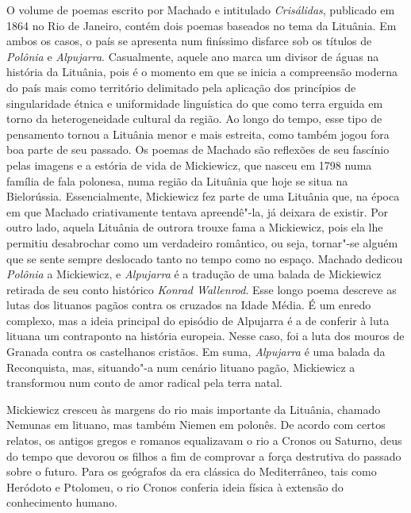 O volume de poemas escrito por Machado e intitulado \textit{Crisálidas},
publicado em 1864 no Rio de Janeiro, contém dois poemas baseados no tema
da Lituânia. Em ambos os casos, o país se apresenta num finíssimo
disfarce sob os títulos de \textit{Polônia} e \textit{Alpujarra}.
Casualmente, aquele ano marca um divisor de águas na história da
Lituânia, pois é o momento em que se inicia a compreensão moderna do
país mais como território delimitado pela aplicação dos princípios de
singularidade étnica e uniformidade linguística do que como terra
erguida em torno da heterogeneidade cultural da região. Ao longo do
tempo, esse tipo de pensamento tornou a Lituânia menor e mais estreita,
como também jogou fora boa parte de seu passado. Os poemas de Machado
são reflexões de seu fascínio pelas imagens e a estória de vida de
Mickiewicz, que nasceu em 1798 numa família de fala polonesa, numa
região da Lituânia que hoje se situa na Bielorússia. Essencialmente,
Mickiewicz fez parte de uma Lituânia que, na época em que Machado
criativamente tentava apreendê"-la, já deixara de existir. Por outro
lado, aquela Lituânia de outrora trouxe fama a Mickiewicz, pois ela lhe
permitiu desabrochar como um verdadeiro romântico, ou seja, tornar"-se
alguém que se sente sempre deslocado tanto no tempo como no espaço.
Machado dedicou \textit{Polônia} a Mickiewicz, e \textit{Alpujarra} é a
tradução de uma balada de Mickiewicz retirada de seu conto histórico
\textit{Konrad Wallenrod}. Esse longo poema descreve as lutas dos lituanos
pagãos contra os cruzados na Idade Média. É um enredo complexo, mas a
ideia principal do episódio de Alpujarra é a de conferir à luta lituana
um contraponto na história europeia. Nesse caso, foi a luta dos mouros
de Granada contra os castelhanos cristãos. Em suma, \textit{Alpujarra} é
uma balada da Reconquista, mas, situando"-a num cenário lituano pagão,
Mickiewicz a transformou num conto de amor radical pela terra natal.

Mickiewicz cresceu às margens do rio mais importante da Lituânia,
chamado Nemunas em lituano, mas também Niemen em polonês. De acordo com
certos relatos, os antigos gregos e romanos equalizavam o rio a Cronos
ou Saturno, deus do tempo que devorou os filhos a fim de comprovar a
força destrutiva do passado sobre o futuro. Para os geógrafos da era
clássica do Mediterrâneo, tais como Heródoto e Ptolomeu, o rio Cronos
conferia ideia física à extensão do conhecimento humano.

